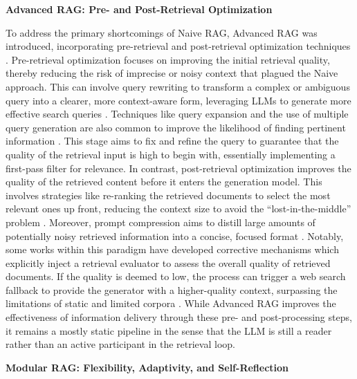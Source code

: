 \documentclass[11pt]{article}
\begin{document}
\textbf{Advanced RAG: Pre- and Post-Retrieval Optimization}

To address the primary shortcomings of Naive RAG, Advanced RAG was introduced, incorporating pre-retrieval and post-retrieval optimization techniques \cite{ref23,ref38}. Pre-retrieval optimization focuses on improving the initial retrieval quality, thereby reducing the risk of imprecise or noisy context that plagued the Naive approach. This can involve query rewriting to transform a complex or ambiguous query into a clearer, more context-aware form, leveraging LLMs to generate more effective search queries \cite{ref39}. Techniques like query expansion and the use of multiple query generation are also common to improve the likelihood of finding pertinent information \cite{ref23}. This stage aims to fix and refine the query to guarantee that the quality of the retrieval input is high to begin with, essentially implementing a first-pass filter for relevance. In contrast, post-retrieval optimization improves the quality of the retrieved content before it enters the generation model. This involves strategies like re-ranking the retrieved documents to select the most relevant ones up front, reducing the context size to avoid the ``lost-in-the-middle'' problem \cite{ref23}. Moreover, prompt compression aims to distill large amounts of potentially noisy retrieved information into a concise, focused format \cite{ref23}. Notably, some works within this paradigm have developed corrective mechanisms which explicitly inject a retrieval evaluator to assess the overall quality of retrieved documents. If the quality is deemed to low, the process can trigger a web search fallback to provide the generator with a higher-quality context, surpassing the limitations of static and limited corpora \cite{ref40}. While Advanced RAG improves the effectiveness of information delivery through these pre- and post-processing steps, it remains a mostly static pipeline in the sense that the LLM is still a reader rather than an active participant in the retrieval loop.

\textbf{Modular RAG: Flexibility, Adaptivity, and Self-Reflection}
\end{document}
